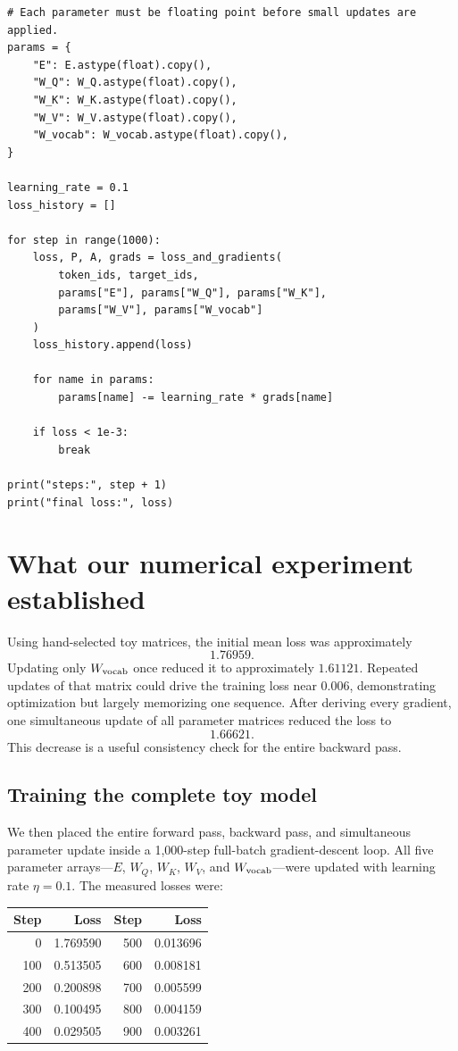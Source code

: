 \documentclass[11pt]{article}
\begin{document}
\begin{lstlisting}
# Each parameter must be floating point before small updates are applied.
params = {
    "E": E.astype(float).copy(),
    "W_Q": W_Q.astype(float).copy(),
    "W_K": W_K.astype(float).copy(),
    "W_V": W_V.astype(float).copy(),
    "W_vocab": W_vocab.astype(float).copy(),
}

learning_rate = 0.1
loss_history = []

for step in range(1000):
    loss, P, A, grads = loss_and_gradients(
        token_ids, target_ids,
        params["E"], params["W_Q"], params["W_K"],
        params["W_V"], params["W_vocab"]
    )
    loss_history.append(loss)

    for name in params:
        params[name] -= learning_rate * grads[name]

    if loss < 1e-3:
        break

print("steps:", step + 1)
print("final loss:", loss)
\end{lstlisting}

\section{What our numerical experiment established}

Using hand-selected toy matrices, the initial mean loss was approximately
\[
  1.76959.
\]
Updating only $W_{\rm vocab}$ once reduced it to approximately $1.61121$. Repeated updates of that matrix
could drive the training loss near $0.006$, demonstrating optimization but largely memorizing one sequence.
After deriving every gradient, one simultaneous update of all parameter matrices reduced the loss to
\[
  1.66621.
\]
This decrease is a useful consistency check for the entire backward pass.

\subsection{Training the complete toy model}

We then placed the entire forward pass, backward pass, and simultaneous parameter update inside a
1,000-step full-batch gradient-descent loop. All five parameter arrays---$E$, $W_Q$, $W_K$, $W_V$, and
$W_{\rm vocab}$---were updated with learning rate $\eta=0.1$. The measured losses were:

\begin{center}
\begin{tabular}{rr@{\qquad}rr}
\toprule
Step & Loss & Step & Loss\\
\midrule
0   & 1.769590 & 500 & 0.013696\\
100 & 0.513505 & 600 & 0.008181\\
200 & 0.200898 & 700 & 0.005599\\
300 & 0.100495 & 800 & 0.004159\\
400 & 0.029505 & 900 & 0.003261\\
\bottomrule
\end{tabular}
\end{center}
\end{document}
